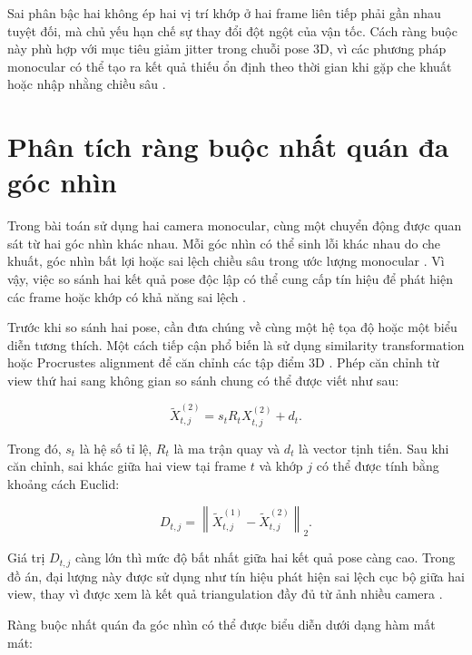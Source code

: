 \documentclass[../DoAn.tex]{subfiles}
\begin{document}
Sai phân bậc hai không ép hai vị trí khớp ở hai frame liên tiếp phải gần nhau tuyệt đối, mà chủ yếu hạn chế sự thay đổi đột ngột của vận tốc. Cách ràng buộc này phù hợp với mục tiêu giảm jitter trong chuỗi pose 3D, vì các phương pháp monocular có thể tạo ra kết quả thiếu ổn định theo thời gian khi gặp che khuất hoặc nhập nhằng chiều sâu \cite{shin2024wham,physcap2020}.

\section{Phân tích ràng buộc nhất quán đa góc nhìn}

Trong bài toán sử dụng hai camera monocular, cùng một chuyển động được quan sát từ hai góc nhìn khác nhau. Mỗi góc nhìn có thể sinh lỗi khác nhau do che khuất, góc nhìn bất lợi hoặc sai lệch chiều sâu trong ước lượng monocular \cite{smplify2016,physcap2020}. Vì vậy, việc so sánh hai kết quả pose độc lập có thể cung cấp tín hiệu để phát hiện các frame hoặc khớp có khả năng sai lệch \cite{gu2024multiview,probtriangulation2023}.

Trước khi so sánh hai pose, cần đưa chúng về cùng một hệ tọa độ hoặc một biểu diễn tương thích. Một cách tiếp cận phổ biến là sử dụng similarity transformation hoặc Procrustes alignment để căn chỉnh các tập điểm 3D \cite{gu2024multiview}. Phép căn chỉnh từ view thứ hai sang không gian so sánh chung có thể được viết như sau:

\begin{equation}
\tilde{X}^{(2)}_{t,j}
=
s_t R_t X^{(2)}_{t,j} + d_t.
\end{equation}

Trong đó, $s_t$ là hệ số tỉ lệ, $R_t$ là ma trận quay và $d_t$ là vector tịnh tiến. Sau khi căn chỉnh, sai khác giữa hai view tại frame $t$ và khớp $j$ có thể được tính bằng khoảng cách Euclid:

\begin{equation}
D_{t,j}
=
\left\|
\tilde{X}^{(1)}_{t,j}
-
\tilde{X}^{(2)}_{t,j}
\right\|_2.
\end{equation}

Giá trị $D_{t,j}$ càng lớn thì mức độ bất nhất giữa hai kết quả pose càng cao. Trong đồ án, đại lượng này được sử dụng như tín hiệu phát hiện sai lệch cục bộ giữa hai view, thay vì được xem là kết quả triangulation đầy đủ từ ảnh nhiều camera \cite{probtriangulation2023,gu2024multiview}.

Ràng buộc nhất quán đa góc nhìn có thể được biểu diễn dưới dạng hàm mất mát:
\end{document}
